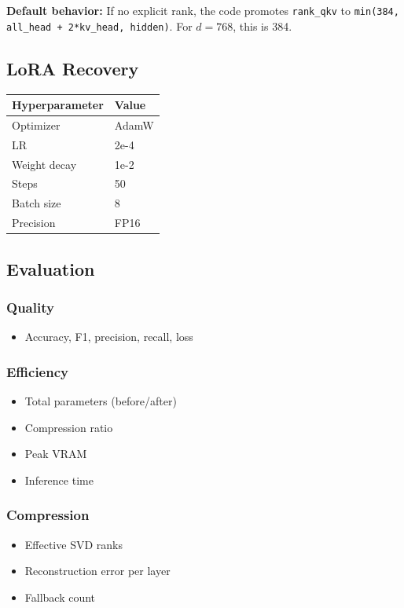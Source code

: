 \textbf{Default behavior:} If no explicit rank, the code promotes \texttt{rank\_qkv} to 
\texttt{min(384, all\_head + 2*kv\_head, hidden)}. For $d = 768$, this is 384.

\subsection{LoRA Recovery}

\begin{table}[H]
\centering
\small
\begin{tabular}{ll}
\toprule
\textbf{Hyperparameter} & \textbf{Value} \\
\midrule
Optimizer & AdamW \\
LR & 2e-4 \\
Weight decay & 1e-2 \\
Steps & 50 \\
Batch size & 8 \\
Precision & FP16 \\
\bottomrule
\end{tabular}
\end{table}

\subsection{Evaluation}

\subsubsection{Quality}
\begin{itemize}
\item Accuracy, F1, precision, recall, loss

\end{itemize}
\subsubsection{Efficiency}
\begin{itemize}
\item Total parameters (before/after)
\item Compression ratio
\item Peak VRAM
\item Inference time

\end{itemize}
\subsubsection{Compression}
\begin{itemize}
\item Effective SVD ranks
\item Reconstruction error per layer
\item Fallback count

\end{itemize}
